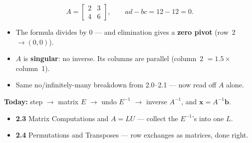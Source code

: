 \documentclass[aspectratio=169, 11pt]{beamer}
\newcommand{\xx}{\mathbf{x}}
\newcommand{\bb}{\mathbf{b}}
\begin{document}
\begin{frame}[t, plain]
  \[
    A=\begin{bmatrix} 2&3\\4&6 \end{bmatrix}, \qquad ad-bc = 12-12 = 0.
  \]
  \begin{itemize}
    \setlength{\itemsep}{5pt}
    \item The formula divides by $0$ --- and elimination gives a \textbf{zero pivot} (row~2 $\to (0,0)$).
    \item $A$ is \textbf{singular}: no inverse. Its columns are parallel (column~2 $=1.5\times$ column~1).
    \item Same no/infinitely-many breakdown from 2.0--2.1 --- now read off $A$ alone.
  \end{itemize}
\end{frame}

\begin{frame}[t, plain]
  \textbf{Today:} step $\to$ matrix $E$ $\to$ undo $E^{-1}$ $\to$ inverse $A^{-1}$, and $\xx=A^{-1}\bb$.\\[8pt]
  \begin{itemize}
    \setlength{\itemsep}{4pt}
    \item \textbf{2.3} Matrix Computations and $A=LU$ --- collect the $E^{-1}$'s into one $L$.
    \item \textbf{2.4} Permutations and Transposes --- row exchanges as matrices, done right.
  \end{itemize}
\end{frame}
\end{document}
